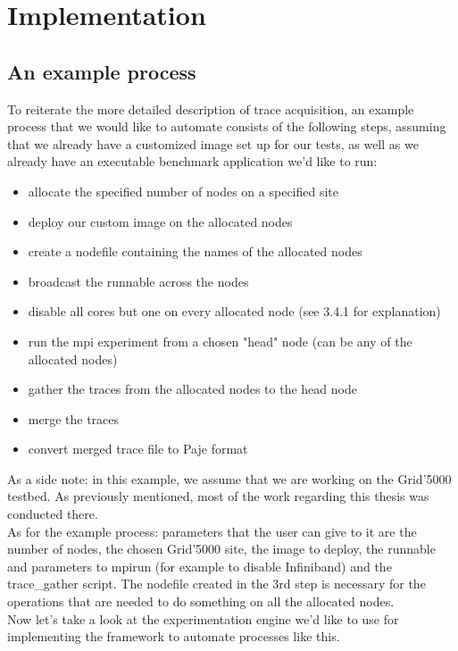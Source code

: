 
\chapter{Implementation}
\label{Chapter4}

\section{An example process}
To reiterate the more detailed description of trace acquisition, an
example process that we would like to automate consists of the
following steps, assuming that we already have a customized image set
up for our tests, as well as we already have an executable benchmark
application we'd like to run:
\begin{itemize}
\item allocate the specified number of nodes on a specified site
\item deploy our custom image on the allocated nodes
\item create a nodefile containing the names of the allocated nodes
\item broadcast the runnable across the nodes
\item disable all cores but one on every allocated node (see 3.4.1 for
  explanation)
\item run the mpi experiment from a chosen "head" node (can be any of
  the allocated nodes)
\item gather the traces from the allocated nodes to the head node
\item merge the traces
\item convert merged trace file to Paje format
\end{itemize}
As a side note: in this example, we assume that we are working on the
Grid'5000 testbed. As previously mentioned, most of the work regarding
this thesis was conducted there.\\
As for the example process: parameters that the user can give to it
are the number of nodes, the chosen Grid'5000 site, the image to
deploy, the runnable and parameters to mpirun (for example to disable
Infiniband) and the trace\_gather script. The nodefile created in the
3rd step is necessary for the operations that are needed to do
something on all the allocated nodes.\\
Now let's take a look at the experimentation engine we'd like to use
for implementing the framework to automate processes like this.
